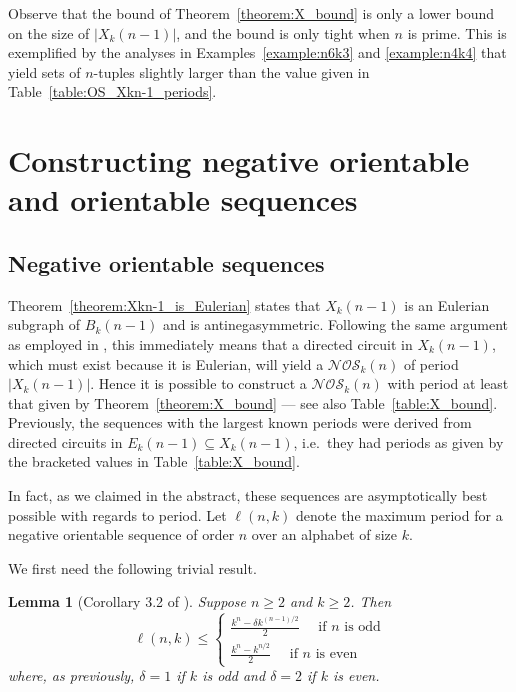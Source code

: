 \documentclass[a4paper,11pt]{article}
\theoremstyle{plain}
\newtheorem{lemma}{Lemma}[section]
\theoremstyle{definition}
\theoremstyle{remark}
\begin{document}
Observe that the bound of Theorem~\ref{theorem:X_bound} is only a lower bound on the size of
$|X_k(n-1)|$, and the bound is only tight when $n$ is prime. This is exemplified by the analyses in
Examples~\ref{example:n6k3} and \ref{example:n4k4} that yield sets of $n$-tuples slightly larger
than the value given in Table~\ref{table:OS_Xkn-1_periods}.

\section{Constructing negative orientable and orientable sequences}  \label{section:NOSs} \label{section:OSs}

\subsection{Negative orientable sequences}

Theorem~\ref{theorem:Xkn-1_is_Eulerian} states that $X_k(n-1)$ is an Eulerian subgraph of
$B_k(n-1)$ and is antinegasymmetric.  Following the same argument as employed in \cite[Section
3.2]{Mitchell25a}, this immediately means that a directed circuit in $X_k(n-1)$, which must exist
because it is Eulerian, will yield a $\mathcal{NOS}_k(n)$ of period $|X_k(n-1)|$.  Hence it is
possible to construct a $\mathcal{NOS}_k(n)$ with period at least that given by
Theorem~\ref{theorem:X_bound}
--- see also Table~\ref{table:X_bound}. Previously, the sequences with the largest known periods
were derived from directed circuits in $E_k({n-1})\subseteq X_k(n-1)$, i.e.\ they had periods as
given by the bracketed values in Table~\ref{table:X_bound}.



In fact, as we claimed in the abstract, these sequences are asymptotically best possible with
regards to period.  Let $\ell(n,k)$ denote the maximum period for a negative orientable sequence of
order $n$ over an alphabet of size $k$.

We first need the following trivial result.

\begin{lemma}[Corollary 3.2 of \cite{Mitchell25a}]  \label{lemma:simple_NOS_bound}
Suppose $n\geq2$ and $k\geq2$. Then
\[
\ell(n,k) \leq \left\{
\begin{aligned}
\frac{k^n-\delta k^{(n-1)/2}}{2} \text{~~~~if $n$ is odd} \\
\frac{k^n - k^{n/2}}{2}\text{~~~~if $n$ is even}
\end{aligned} \right.
\]
where, as previously, $\delta=1$ if $k$ is odd and $\delta=2$ if $k$ is even.
\end{lemma}
\end{document}
